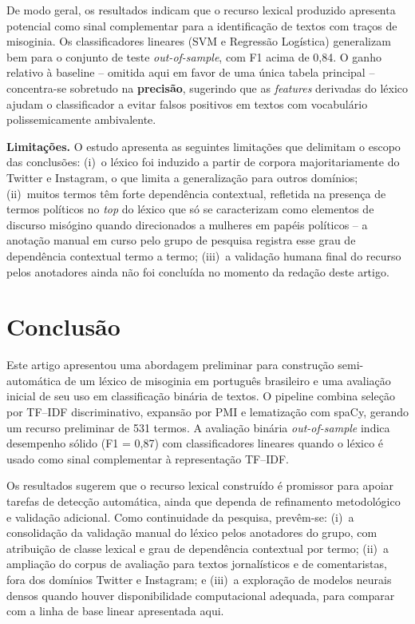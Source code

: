 \documentclass[12pt]{article}
\begin{document}
De modo geral, os resultados indicam que o recurso lexical produzido
apresenta potencial como sinal complementar para a identifica\c{c}\~ao de
textos com tra\c{c}os de misoginia. Os classificadores lineares (SVM e
Regress\~ao Log\'istica) generalizam bem para o conjunto de teste
\emph{out-of-sample}, com F1 acima de 0{,}84. O ganho relativo \`a
baseline -- omitida aqui em favor de uma \'unica tabela principal --
concentra-se sobretudo na \textbf{precis\~ao}, sugerindo que as
\emph{features} derivadas do l\'exico ajudam o classificador a evitar
falsos positivos em textos com vocabul\'ario polissemicamente ambivalente.

\textbf{Limita\c{c}\~oes.} O estudo apresenta as seguintes
limita\c{c}\~oes que delimitam o escopo das conclus\~oes:
(i)~o l\'exico foi induzido a partir de corpora majoritariamente do
Twitter e Instagram, o que limita a generaliza\c{c}\~ao para outros
dom\'inios;
(ii)~muitos termos t\^em forte depend\^encia contextual, refletida na
presen\c{c}a de termos pol\'iticos no \emph{top} do l\'exico que s\'o se
caracterizam como elementos de discurso mis\'ogino quando direcionados a
mulheres em pap\'eis pol\'iticos -- a anota\c{c}\~ao manual em curso pelo
grupo de pesquisa registra esse grau de depend\^encia contextual termo a
termo;
(iii)~a valida\c{c}\~ao humana final do recurso pelos anotadores ainda
n\~ao foi conclu\'ida no momento da reda\c{c}\~ao deste artigo.

\section{Conclus\~ao}

Este artigo apresentou uma abordagem preliminar para constru\c{c}\~ao
semi-autom\'atica de um l\'exico de misoginia em portugu\^es brasileiro
e uma avalia\c{c}\~ao inicial de seu uso em classifica\c{c}\~ao bin\'aria
de textos. O pipeline combina sele\c{c}\~ao por TF--IDF discriminativo,
expans\~ao por PMI e lematiza\c{c}\~ao com spaCy, gerando um recurso
preliminar de 531 termos. A avalia\c{c}\~ao bin\'aria \emph{out-of-sample}
indica desempenho s\'olido (F1 = 0{,}87) com classificadores lineares
quando o l\'exico \'e usado como sinal complementar \`a representa\c{c}\~ao
TF--IDF.

Os resultados sugerem que o recurso lexical constru\'ido \'e promissor
para apoiar tarefas de detec\c{c}\~ao autom\'atica, ainda que dependa de
refinamento metodol\'ogico e valida\c{c}\~ao adicional. Como
continuidade da pesquisa, prev\^em-se: (i)~a consolida\c{c}\~ao da
valida\c{c}\~ao manual do l\'exico pelos anotadores do grupo, com
atribui\c{c}\~ao de classe lexical e grau de depend\^encia contextual
por termo; (ii)~a amplia\c{c}\~ao do corpus de avalia\c{c}\~ao para
textos jornal\'isticos e de comentaristas, fora dos dom\'inios Twitter
e Instagram; e (iii)~a explora\c{c}\~ao de modelos neurais densos quando
houver disponibilidade computacional adequada, para comparar com a
linha de base linear apresentada aqui.



\end{document}
